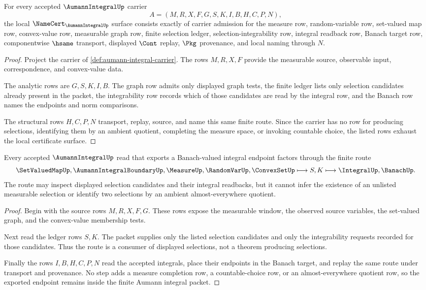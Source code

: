 \begin{theorem}
\label{thm:aumann-integral-namecert-obligations}
For every accepted $\AumannIntegralUp$ carrier
$$
A=(M,R,X,F,G,S,K,I,B,H,C,P,N),
$$
the local $\NameCert_{\AumannIntegralUp}$ surface consists exactly of carrier admission for the measure row, random-variable row, set-valued map row, convex-value row, measurable graph row, finite selection ledger, selection-integrability row, integral readback row, Banach target row, componentwise $\hsame$ transport, displayed $\Cont$ replay, $\Pkg$ provenance, and local naming through $N$.
\end{theorem}
\begin{proof}
Project the carrier of \autoref{def:aumann-integral-carrier}. The rows $M,R,X,F$ provide the measurable source, observable input, correspondence, and convex-value data.

The analytic rows are $G,S,K,I,B$. The graph row admits only displayed graph tests, the finite ledger lists only selection candidates already present in the packet, the integrability row records which of those candidates are read by the integral row, and the Banach row names the endpoints and norm comparisons.

The structural rows $H,C,P,N$ transport, replay, source, and name this same finite route. Since the carrier has no row for producing selections, identifying them by an ambient quotient, completing the measure space, or invoking countable choice, the listed rows exhaust the local certificate surface.
\end{proof}

\begin{theorem}
\label{thm:aumann-integral-selection-route}
Every accepted $\AumannIntegralUp$ read that exports a Banach-valued integral endpoint factors through the finite route
$$
\SetValuedMapUp,\AumannIntegralBoundaryUp,\MeasureUp,\RandomVarUp,\ConvexSetUp
\longmapsto
S,K
\longmapsto
\IntegralUp,\BanachUp .
$$
The route may inspect displayed selection candidates and their integral readbacks, but it cannot infer the existence of an unlisted measurable selection or identify two selections by an ambient almost-everywhere quotient.
\end{theorem}
\begin{proof}
Begin with the source rows $M,R,X,F,G$. These rows expose the measurable window, the observed source variables, the set-valued graph, and the convex-value membership tests.

Next read the ledger rows $S,K$. The packet supplies only the listed selection candidates and only the integrability requests recorded for those candidates. Thus the route is a consumer of displayed selections, not a theorem producing selections.

Finally the rows $I,B,H,C,P,N$ read the accepted integrals, place their endpoints in the Banach target, and replay the same route under transport and provenance. No step adds a measure completion row, a countable-choice row, or an almost-everywhere quotient row, so the exported endpoint remains inside the finite Aumann integral packet.
\end{proof}

